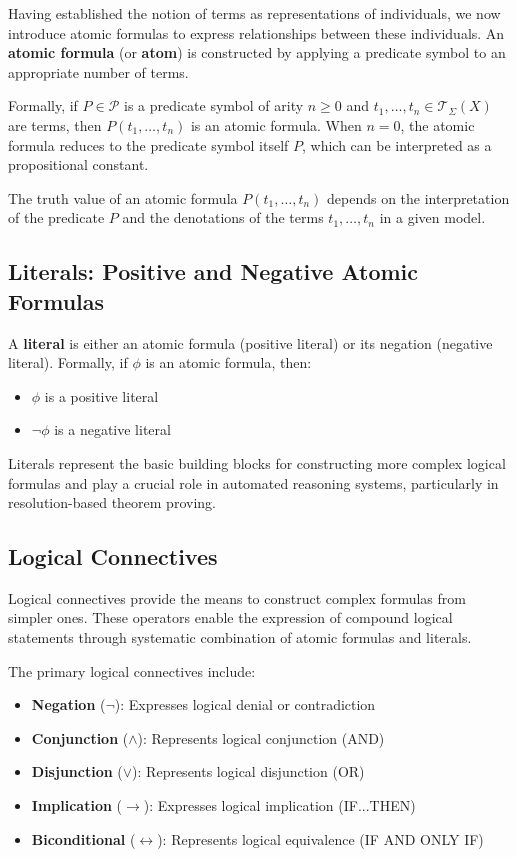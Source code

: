 \documentclass[11pt,a4paper]{article}
\theoremstyle{definition}
\theoremstyle{plain}
\theoremstyle{remark}
\begin{document}
Having established the notion of terms as representations of individuals, we now introduce atomic formulas to express relationships between these individuals. An \textbf{atomic formula} (or \textbf{atom}) is constructed by applying a predicate symbol to an appropriate number of terms.

Formally, if $P \in \mathcal{P}$ is a predicate symbol of arity $n \geq 0$ and $t_1, \dots, t_n \in \mathcal{T}_\Sigma(X)$ are terms, then $P(t_1, \dots, t_n)$ is an atomic formula. When $n = 0$, the atomic formula reduces to the predicate symbol itself $P$, which can be interpreted as a propositional constant.

The truth value of an atomic formula $P(t_1, \dots, t_n)$ depends on the interpretation of the predicate $P$ and the denotations of the terms $t_1, \dots, t_n$ in a given model.

\subsection{Literals: Positive and Negative Atomic Formulas}

A \textbf{literal} is either an atomic formula (positive literal) or its negation (negative literal). Formally, if $\phi$ is an atomic formula, then:
\begin{itemize}
    \item $\phi$ is a positive literal
    \item $\neg \phi$ is a negative literal
\end{itemize}

Literals represent the basic building blocks for constructing more complex logical formulas and play a crucial role in automated reasoning systems, particularly in resolution-based theorem proving.

\subsection{Logical Connectives}

Logical connectives provide the means to construct complex formulas from simpler ones. These operators enable the expression of compound logical statements through systematic combination of atomic formulas and literals.

The primary logical connectives include:
\begin{itemize}
    \item \textbf{Negation} ($\neg$): Expresses logical denial or contradiction
    \item \textbf{Conjunction} ($\wedge$): Represents logical conjunction (AND)
    \item \textbf{Disjunction} ($\vee$): Represents logical disjunction (OR)
    \item \textbf{Implication} ($\rightarrow$): Expresses logical implication (IF...THEN)
    \item \textbf{Biconditional} ($\leftrightarrow$): Represents logical equivalence (IF AND ONLY IF)
\end{itemize}
\end{document}
